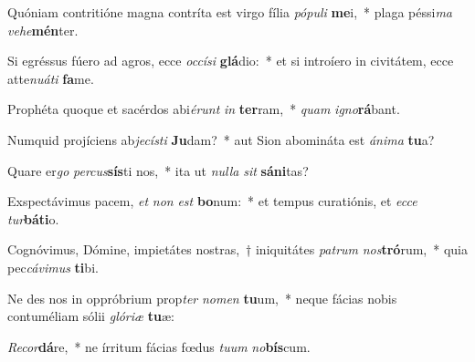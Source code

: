 \item Quóniam contritióne magna contríta est virgo fília \textit{pó}\textit{pu}\textit{li} \textbf{me}i,~* plaga péssi\textit{ma} \textit{ve}\textit{he}\textbf{mén}ter.
\item Si egréssus fúero ad agros, ecce \textit{oc}\textit{cí}\textit{si} \textbf{glá}dio:~* et si introíero in civitátem, ecce atte\textit{nu}\textit{á}\textit{ti} \textbf{fa}me.
\item Prophéta quoque et sacérdos abi\textit{é}\textit{runt} \textit{in} \textbf{ter}ram,~* \textit{quam} \textit{i}\textit{gno}\textbf{rá}bant.
\item Numquid projíciens ab\textit{je}\textit{cís}\textit{ti} \textbf{Ju}dam?~* aut Sion abomináta est \textit{á}\textit{ni}\textit{ma} \textbf{tu}a?
\item Quare er\textit{go} \textit{per}\textit{cus}\textbf{sís}ti nos,~* ita ut \textit{nul}\textit{la} \textit{sit} \textbf{sá}\textbf{ni}tas?
\item Exspectávimus pacem, \textit{et} \textit{non} \textit{est} \textbf{bo}num:~* et tempus curatiónis, et \textit{ec}\textit{ce} \textit{tur}\textbf{bá}\textbf{ti}o.
\item Cognóvimus, Dómine, impietátes nostras,~† iniquitátes \textit{pa}\textit{trum} \textit{nos}\textbf{tró}rum,~* quia pec\textit{cá}\textit{vi}\textit{mus} \textbf{ti}bi.
\item Ne des nos in oppróbrium prop\textit{ter} \textit{no}\textit{men} \textbf{tu}um,~* neque fácias nobis contuméliam sólii \textit{gló}\textit{ri}\textit{æ} \textbf{tu}æ:
\item \textit{Re}\textit{cor}\textbf{dá}re,~* ne írritum fácias fœdus \textit{tu}\textit{um} \textit{no}\textbf{bís}cum.
